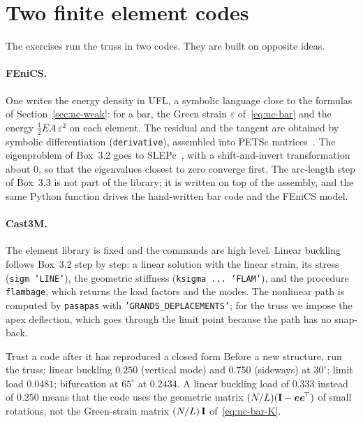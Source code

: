 \section{Two finite element codes}\label{sec:nc-tools}
%

The exercises run the truss in two codes. They are built on opposite ideas.

\paragraph{FEniCS.}
One writes the energy density in UFL, a symbolic language close to the formulas
of Section~\ref{sec:nc-weak}: for a bar, the Green strain $\varepsilon$ of~\eqref{eq:nc-bar}
and the energy $\tfrac12EA\,\varepsilon^2$ on each element. The residual and the tangent are
obtained by symbolic differentiation (\texttt{derivative}), assembled into PETSc
matrices~\cite{nc-logg2012}. The eigenproblem of Box~3.2 goes to SLEPc~\cite{nc-hernandez2005},
with a shift-and-invert transformation about $0$, so that the eigenvalues closest to zero
converge first. The arc-length step of Box~3.3 is not part of the library; it is written
on top of the assembly, and the same Python function drives the hand-written bar code
and the FEniCS model.

\paragraph{Cast3M.}
The element library is fixed and the commands are high level. Linear buckling follows
Box~3.2 step by step: a linear solution with the linear strain, its stress
(\texttt{sigm 'LINE'}), the geometric stiffness (\texttt{ksigma ... 'FLAM'}), and the
procedure \texttt{flambage}, which returns the load factors and the modes. The nonlinear
path is computed by \texttt{pasapas} with \texttt{'GRANDS\_DEPLACEMENTS'}; for the truss we
impose the apex deflection, which goes through the limit point because the path has no
snap-back.

\begin{gbox}{Trust a code after it has reproduced a closed form}\label{sec:nc-trust}
%
Before a new structure, run the truss: linear buckling $0.250$ (vertical mode) and $0.750$
(sideways) at $30^\circ$; limit load $0.0481$; bifurcation at $65^\circ$ at $0.2434$.
A linear buckling load of $0.333$ instead of $0.250$ means that the code uses the geometric
matrix $(N/L)(\mathbf{I} - \bm{e}\bm{e}^{\!\top})$ of small rotations, not the Green-strain matrix
$(N/L)\,\mathbf{I}$ of~\eqref{eq:nc-bar-K}.
\end{gbox}

